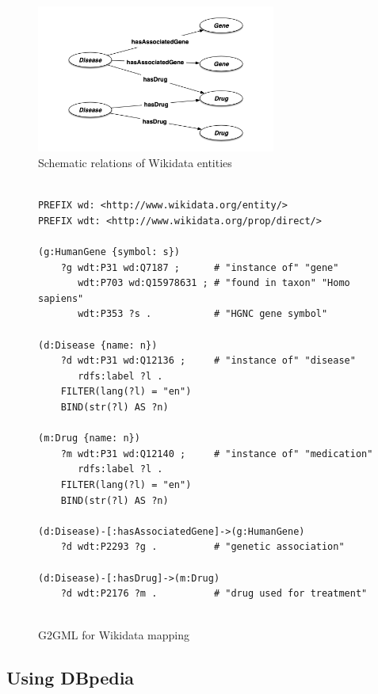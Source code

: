 \documentclass[runningheads]{llncs}
\begin{document}
\begin{figure}
\center
\includegraphics[width=0.7\textwidth]{wikidata_schema.png}
\caption{Schematic relations of Wikidata entities}
\label{fig:wikidata_schema.png}
\end{figure}
 
\begin{figure}[!t]
\vspace{2mm}
\begin{scriptsize}
\begin{verbatim}
 
PREFIX wd: <http://www.wikidata.org/entity/>
PREFIX wdt: <http://www.wikidata.org/prop/direct/>
 
(g:HumanGene {symbol: s})
    ?g wdt:P31 wd:Q7187 ;      # "instance of" "gene"
       wdt:P703 wd:Q15978631 ; # "found in taxon" "Homo sapiens"
       wdt:P353 ?s .           # "HGNC gene symbol"
 
(d:Disease {name: n})
    ?d wdt:P31 wd:Q12136 ;     # "instance of" "disease"
       rdfs:label ?l .
    FILTER(lang(?l) = "en")
    BIND(str(?l) AS ?n)
 
(m:Drug {name: n})
    ?m wdt:P31 wd:Q12140 ;     # "instance of" "medication"
       rdfs:label ?l .
    FILTER(lang(?l) = "en")
    BIND(str(?l) AS ?n)
 
(d:Disease)-[:hasAssociatedGene]->(g:HumanGene)
    ?d wdt:P2293 ?g .          # "genetic association"
 
(d:Disease)-[:hasDrug]->(m:Drug)
    ?d wdt:P2176 ?m .          # "drug used for treatment"
 
\end{verbatim}
\end{scriptsize}
\caption{G2GML for Wikidata mapping}
\label{fig:g2gml_wikidata}
\end{figure}
 
\subsection{Using DBpedia}
 
\end{document}
